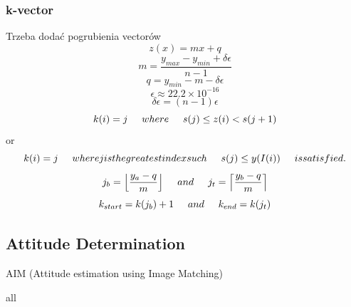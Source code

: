 \documentclass[12pt,a4paper,oneside]{article}
\begin{document}
\subsubsection{k-vector}

\cite{mortari2013k}\par
\cite{mortari1996fast}\par
\cite{mortari2000k}\par
Trzeba dodać pogrubienia vectorów
\begin{equation}
z(x) = mx + q
\end{equation}
\begin{equation}
m = \frac{y_{max} - y_{min} + \delta\epsilon}{n - 1}
\end{equation}
\begin{equation}
q = y_{min} - m - \delta\epsilon
\end{equation}
\begin{equation}
\epsilon \approx 22.2 \times 10^{-16}
\end{equation}
\begin{equation}
\delta\epsilon = (n - 1)\epsilon
\end{equation}
\begin{equation}
k(i) = j \hspace{0.5cm} where \hspace{0.5cm} s(j) \leq z(i) < s(j + 1)
\end{equation}
or
\begin{equation}
k(i) = j \hspace{0.5cm} where j is the greatest index such \hspace{0.5cm} s(j) \leq y(I(i)) \hspace{0.5cm} is satisfied.
\end{equation}
\begin{equation}
j_b = \Big\lfloor\frac{y_a - q}{m}\Big\rfloor \hspace{0.5cm} and \hspace{0.5cm} j_t = \Big\lceil\frac{y_b - q}{m}\Big\rceil
\end{equation}
\begin{equation}
k_{start} = k(j_b) + 1 \hspace{0.5cm} and \hspace{0.5cm} k_{end} = k(j_t)
\end{equation}
\subsection{Attitude Determination}
\cite{jenssen2011comparison}\par
AIM (Attitude estimation using Image Matching)\cite{delabie2012highly}\par
all \cite{hall2003spacecraft} \cite{markley1999estimate}
\end{document}
